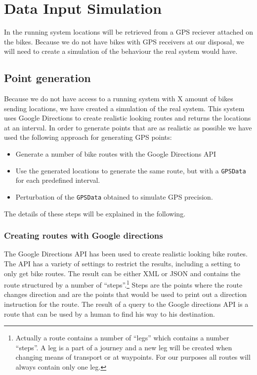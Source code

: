 \section{Data Input Simulation}\label{design:datasimulation}
In the running system locations will be retrieved from a GPS reciever attached on the bikes.
Because we do not have bikes with GPS receivers at our disposal, we will need to create a simulation of the behaviour the real system would have.

\subsection{Point generation}
Because we do not have access to a running system with X amount of bikes sending locations, we have created a simulation of the real system.
This system uses Google Directions to create realistic looking routes and returns the locations at an interval.
In order to generate points that are as realistic as possible we have used the following approach for generating GPS points:

\begin{itemize}
\item Generate a number of bike routes with the Google Directions API
\item Use the generated locations to generate the same route, but with a \texttt{GPSData} for each predefined interval.
\item Perturbation of the \texttt{GPSData} obtained to simulate GPS precision.
\end{itemize}

The details of these steps will be explained in the following.

\subsubsection{Creating routes with Google directions}

The Google Directions API \cite{gdirections} has been used to create realistic looking bike routes.
The API has a variety of settings to restrict the results, including a setting to only get bike routes.
The result can be either XML or JSON and contains the route structured by a number of ``steps''.\footnote{Actually a route contains a number of  ``legs'' which contains a number ``steps''. 
A leg is a part of a journey and a new leg will be created when changing means of transport or at waypoints.
For our purposes all routes will always contain only one leg.}
Steps are the points where the route changes direction and are the points that would be used to print out a direction instruction for the route.
The result of a query to the Google directions API is a route that can be used by a human to find his way to his destination.

